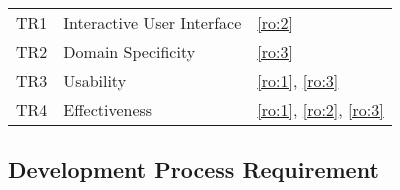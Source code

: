 \begin{longtable}{@{}lll@{}}
\begin{minipage}[t]{0.18\columnwidth}\raggedright
TR1\strut
\end{minipage} & 
\begin{minipage}[t]{0.45\columnwidth}\raggedright
Interactive User Interface\strut
\end{minipage} & 
\begin{minipage}[t]{0.27\columnwidth}\raggedright
\cref{ro:2}\strut
\end{minipage}\tabularnewline

\begin{minipage}[t]{0.18\columnwidth}\raggedright
TR2\strut
\end{minipage} & 
\begin{minipage}[t]{0.45\columnwidth}\raggedright
Domain Specificity\strut
\end{minipage} & 
\begin{minipage}[t]{0.27\columnwidth}\raggedright
\cref{ro:3}\strut
\end{minipage}\tabularnewline

\begin{minipage}[t]{0.18\columnwidth}\raggedright
TR3\strut
\end{minipage} & 
\begin{minipage}[t]{0.45\columnwidth}\raggedright
Usability\strut
\end{minipage} & 
\begin{minipage}[t]{0.27\columnwidth}\raggedright
\cref{ro:1}, \cref{ro:3}\strut
\end{minipage}\tabularnewline

\begin{minipage}[t]{0.18\columnwidth}\raggedright
TR4\strut
\end{minipage} & 
\begin{minipage}[t]{0.45\columnwidth}\raggedright
Effectiveness\strut
\end{minipage} & 
\begin{minipage}[t]{0.27\columnwidth}\raggedright
\cref{ro:1}, \cref{ro:2}, \cref{ro:3}\strut
\end{minipage}\tabularnewline

\bottomrule
\end{longtable}

\vspace{-10pt}
\hypertarget{sec:dp-requirements}{%
\subsection{Development Process Requirement}\label{sec:dp-requirements}}
\vspace{10pt}

